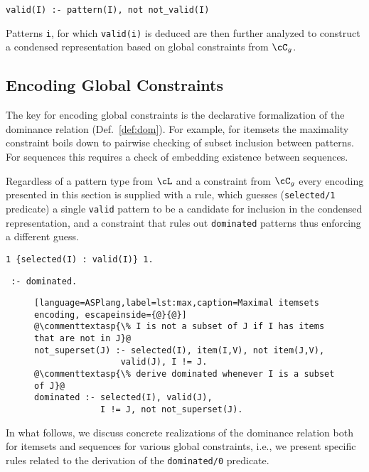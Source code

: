 \small{
\begin{center}
\texttt{valid(I) :- pattern(I), not not\_valid(I)}
\end{center}}

\normalsize{Patterns \texttt{i}, for which \texttt{valid(i)} is deduced are then further analyzed to construct a condensed representation based on global constraints from $\cC_g$.}


\subsection{Encoding Global Constraints}

The key for encoding global constraints is the declarative formalization of the dominance relation (Def.~\ref{def:dom}). For example, for itemsets the maximality constraint boils down to pairwise checking of subset inclusion between patterns. For sequences this requires a check of embedding existence between sequences.



 Regardless of a pattern type from $\cL$ %
and a constraint from $\cC_g$ every encoding presented 
in this section is supplied with a rule, which guesses (\texttt{selected/1} predicate) a single \texttt{valid} pattern to be a candidate for inclusion in the condensed representation, and a constraint that rules out \texttt{dominated} patterns thus enforcing a different guess. 


\small{\begin{center}
\texttt{1 \{selected(I) : valid(I)\} 1.}
\end{center}

\begin{center}
\texttt{ :- dominated.}
\end{center}}


 \begin{figure}[t]
\small{
 \begin{lstlisting}[language=ASPlang,label=lst:max,caption=Maximal itemsets encoding, escapeinside={@}{@}]
@\commenttextasp{\% I is not a subset of J if I has items that are not in J}@
not_superset(J) :- selected(I), item(I,V), not item(J,V), 
                 valid(J), I != J.
@\commenttextasp{\% derive dominated whenever I is a subset of J}@
dominated :- selected(I), valid(J), 
             I != J, not not_superset(J).
\end{lstlisting}}
 \end{figure}
 \normalsize{In what follows, we discuss concrete realizations of the dominance relation both for itemsets and sequences for various global constraints, i.e., we present specific rules related to the derivation of the \texttt{dominated/0} predicate.
}

